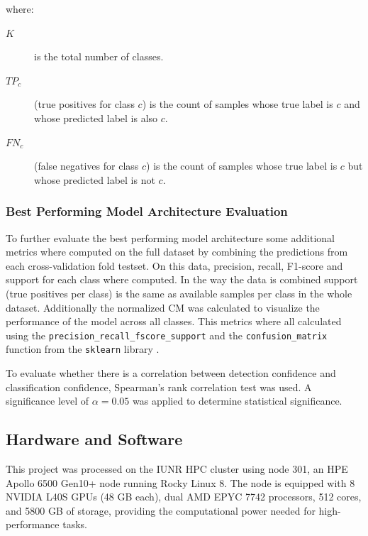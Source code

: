     \noindent where:
    \begin{description}
        \item[\(K\)] is the total number of classes.
        \item[\(TP_{c}\)] (true positives for class \(c\)) is the count of samples whose true label is \(c\) and whose predicted label is also \(c\).
        \item[\(FN_{c}\)] (false negatives for class \(c\)) is the count of samples whose true label is \(c\) but whose predicted label is not \(c\).
    \end{description}

    \subsubsection{Best Performing Model Architecture Evaluation}
    To further evaluate the best performing model architecture some additional metrics where computed on the full dataset by combining the predictions from each cross-validation fold testset.
    On this data, precision, recall, F1-score and support for each class where computed.
    In the way the data is combined support (true positives per class) is the same as available samples per class in the whole dataset.
    Additionally the normalized \ac{CM} was calculated to visualize the performance of the model across all classes.
    This metrics where all calculated using the \texttt{precision\_recall\_fscore\_support} and the \texttt{confusion\_matrix} function from the \texttt{sklearn} library \autocite{pedregosaScikitlearnMachineLearning2011}.

    To evaluate whether there is a correlation between detection confidence and classification confidence, Spearman's rank correlation test was used. 
    A significance level of \( \alpha = 0.05 \) was applied to determine statistical significance.
    

    \subsection{Hardware and Software}

    This project was processed on the \ac{IUNR} \ac{HPC} cluster using node 301, an HPE Apollo 6500 Gen10+ node running Rocky Linux 8. 
    The node is equipped with 8 NVIDIA L40S \acp{GPU} (48 \ac{GB} each), dual AMD EPYC 7742 processors, 512 cores, and 5800 \ac{GB} of storage, providing the computational power needed for high-performance tasks.

